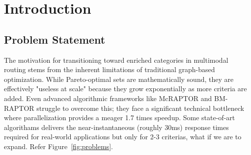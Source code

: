 \documentclass[12pt,a4paper]{article}
\begin{document}
\begin{abstract}
    \noindent
    This report presents a generalised routing engine for the inner Bengaluru
    multimodal network (road + BMTC bus) whose design separates graph topology
    from cost algebra.  The same Dijkstra backbone operates on a single
    intermodal graph $G = G_r \cup G_b \cup G_t$, while interchangeable
    \emph{semiring} instances encode distance, travel time, fare, safety, or
    lexicographic combinations thereof.  The mathematical basis draws from two
    complementary traditions: the \emph{tropical-semiring} and
    \emph{semiring-shortest-distance} framework of Mohri~\cite{mohri2002}, the
    \emph{dioid} perspective on algebraic path problems of Gondran and
    Minoux~\cite{gondran2008}, and the categorical treatment of routing
    networks in Fong and Spivak's \emph{Applied Category Theory}
    \cite{fong2019} and the \emph{ACT4E} notes~\cite{act4e}.  The algorithmic
    analysis follows the CLRS treatment of single-source shortest-path
    algorithms~\cite{clrs}.  A working Python prototype demonstrates that
    fixed-objective semiring routing is often more practical than full
    Pareto-front enumeration within a unified multimodal state-space.
\end{abstract}
\newpage
\tableofcontents
\newpage

\section{Introduction}
\label{sec:intro}

\subsection{Problem Statement}

The motivation for transitioning toward enriched categories in multimodal routing stems from the inherent limitations of traditional graph-based optimization. While Pareto-optimal sets are mathematically sound, they are effectively "useless at scale" because they grow exponentially as more criteria are added. Even advanced algorithmic frameworks like McRAPTOR and BM-RAPTOR struggle to overcome this; they face a significant technical bottleneck where parallelization provides a meager 1.7 times speedup. Some state-of-art algorithams delivers the near-instantaneous (roughly 30ms) response times required for real-world applications but only for 2-3 criterias, what if we are to expand. Refer Figure~\ref{fig:problems}.
\end{document}
